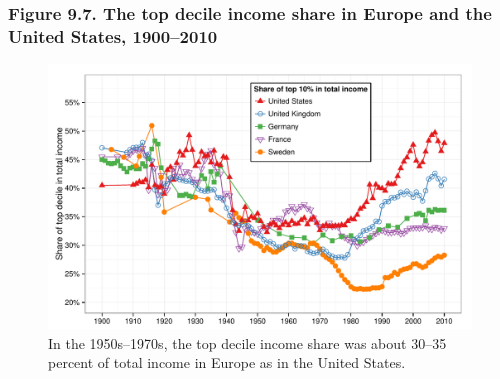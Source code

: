 \documentclass[t]{beamer}\usepackage[]{graphicx}\usepackage[]{color}
\newenvironment{knitrout}{}{} %
\begin{document}
\begin{frame}[label=Figure_9_7]
\frametitle{Figure 9.7. The top decile income share in Europe and the United States, 1900--2010}
\begin{figure}[t]
\begin{minipage}[b]{\textwidth}
\centering
\begin{knitrout}\footnotesize
{}\color{fgcolor}

{\centering \includegraphics[width=1\linewidth]{figures/color/Figure_9_7} 

}



\end{knitrout}
\caption{In the 1950s--1970s, the top decile income share was about 30--35 percent of total income in Europe as in the United States.}
\end{minipage}
\end{figure}
\end{frame}
\end{document}
